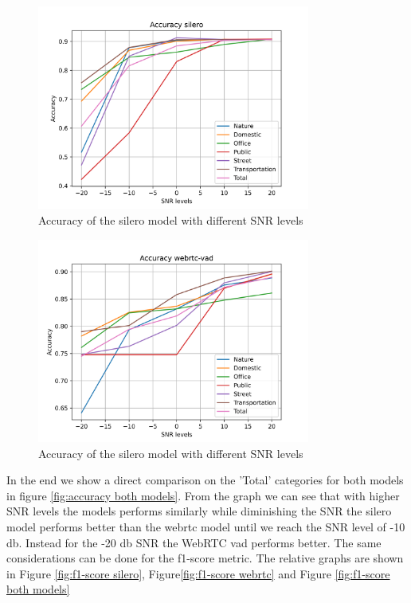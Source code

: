 \documentclass[../main.tex]{subfiles}
\begin{document}
\begin{figure}[ht]
    \centering
    \includegraphics[width=0.8\textwidth]{images/Accuracy silero.png}
    \caption{Accuracy of the silero model with different SNR levels}
    \label{fig:accuracy silero}
\end{figure}

\begin{figure}[ht]
    \centering
    \includegraphics[width=0.8\textwidth]{images/Accuracy webrtc-vad.png}
    \caption{Accuracy of the silero model with different SNR levels}
    \label{fig:accuracy webrtc}
\end{figure}

In the end we show a direct comparison on the 'Total' categories for both models in figure \ref{fig:accuracy both models}. From the graph we can see that with higher SNR levels the models performs similarly while diminishing the SNR the silero model performs better than the webrtc model until we reach the SNR level of -10 db. Instead for the -20 db SNR the WebRTC vad performs better. The same considerations can be done for the f1-score metric. The relative graphs are shown in Figure \ref{fig:f1-score silero}, Figure\ref{fig:f1-score webrtc} and Figure \ref{fig:f1-score both models}
\end{document}
